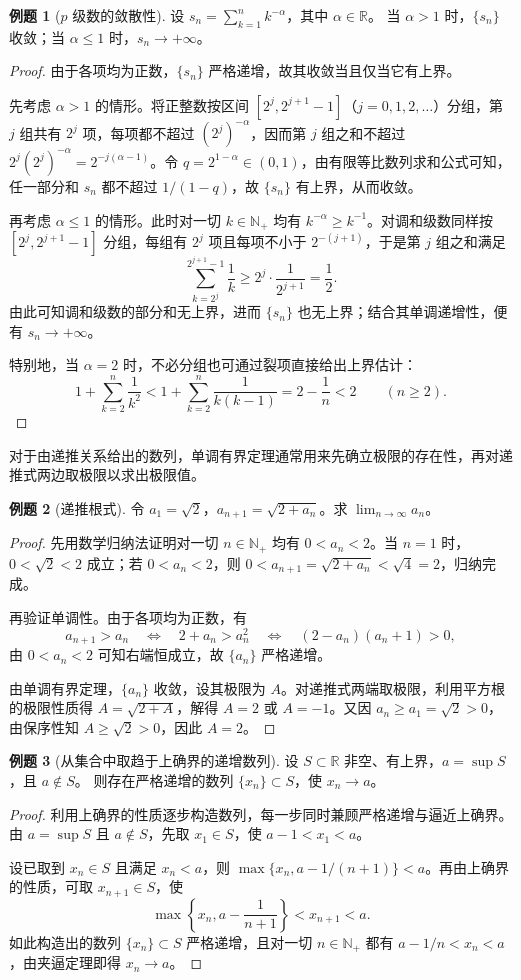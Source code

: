 \documentclass[UTF8, fontset=fandol, a4paper, 12pt]{ctexart}
\newcommand{\R}{\mathbb R}
\newcommand{\Nplus}{\mathbb N_{+}}
\theoremstyle{definition}
\newtheorem*{example}{例题}
\begin{document}
\begin{example}[$p$ 级数的敛散性]
设 $s_n=\sum_{k=1}^{n}k^{-\alpha}$，其中 $\alpha\in\R$。
当 $\alpha>1$ 时，$\{s_n\}$ 收敛；当 $\alpha\le1$ 时，$s_n\to+\infty$。
\end{example}
\begin{proof}
由于各项均为正数，$\{s_n\}$ 严格递增，故其收敛当且仅当它有上界。

先考虑 $\alpha>1$ 的情形。将正整数按区间 $[2^j,2^{j+1}-1]$（$j=0,1,2,\ldots$）分组，第 $j$ 组共有 $2^j$ 项，每项都不超过 $(2^j)^{-\alpha}$，因而第 $j$ 组之和不超过 $2^j(2^j)^{-\alpha}=2^{-j(\alpha-1)}$。令 $q=2^{1-\alpha}\in(0,1)$，由有限等比数列求和公式可知，任一部分和 $s_n$ 都不超过 $1/(1-q)$，故 $\{s_n\}$ 有上界，从而收敛。

再考虑 $\alpha\le1$ 的情形。此时对一切 $k\in\Nplus$ 均有 $k^{-\alpha}\ge k^{-1}$。对调和级数同样按 $[2^j,2^{j+1}-1]$ 分组，每组有 $2^j$ 项且每项不小于 $2^{-(j+1)}$，于是第 $j$ 组之和满足
\[
\sum_{k=2^j}^{2^{j+1}-1}\frac1k\ge 2^j\cdot\frac1{2^{j+1}}=\frac12.
\]
由此可知调和级数的部分和无上界，进而 $\{s_n\}$ 也无上界；结合其单调递增性，便有 $s_n\to+\infty$。

特别地，当 $\alpha=2$ 时，不必分组也可通过裂项直接给出上界估计：
\[
1+\sum_{k=2}^{n}\frac1{k^2}
<1+\sum_{k=2}^{n}\frac1{k(k-1)}
=2-\frac1n<2\qquad(n\ge2).
\]
\end{proof}

对于由递推关系给出的数列，单调有界定理通常用来先确立极限的存在性，再对递推式两边取极限以求出极限值。

\begin{example}[递推根式]
令 $a_1=\sqrt2$，$a_{n+1}=\sqrt{2+a_n}$。求 $\lim_{n\to\infty}a_n$。
\end{example}
\begin{proof}
先用数学归纳法证明对一切 $n\in\Nplus$ 均有 $0<a_n<2$。当 $n=1$ 时，$0<\sqrt2<2$ 成立；若 $0<a_n<2$，则 $0<a_{n+1}=\sqrt{2+a_n}<\sqrt4=2$，归纳完成。

再验证单调性。由于各项均为正数，有
\[
a_{n+1}>a_n
\quad\Longleftrightarrow\quad
2+a_n>a_n^2
\quad\Longleftrightarrow\quad
(2-a_n)(a_n+1)>0,
\]
由 $0<a_n<2$ 可知右端恒成立，故 $\{a_n\}$ 严格递增。

由单调有界定理，$\{a_n\}$ 收敛，设其极限为 $A$。对递推式两端取极限，利用平方根的极限性质得 $A=\sqrt{2+A}$，解得 $A=2$ 或 $A=-1$。又因 $a_n\ge a_1=\sqrt2>0$，由保序性知 $A\ge\sqrt2>0$，因此 $A=2$。
\end{proof}

\begin{example}[从集合中取趋于上确界的递增数列]
设 $S\subset\R$ 非空、有上界，$a=\sup S$，且 $a\notin S$。
则存在严格递增的数列 $\{x_n\}\subset S$，使 $x_n\to a$。
\end{example}
\begin{proof}
利用上确界的性质逐步构造数列，每一步同时兼顾严格递增与逼近上确界。由 $a=\sup S$ 且 $a\notin S$，先取 $x_1\in S$，使 $a-1<x_1<a$。

设已取到 $x_n\in S$ 且满足 $x_n<a$，则 $\max\{x_n,a-1/(n+1)\}<a$。再由上确界的性质，可取 $x_{n+1}\in S$，使
\[
\max\left\{x_n,a-\frac1{n+1}\right\}<x_{n+1}<a.
\]
如此构造出的数列 $\{x_n\}\subset S$ 严格递增，且对一切 $n\in\Nplus$ 都有 $a-1/n<x_n<a$，由夹逼定理即得 $x_n\to a$。
\end{proof}
\end{document}
